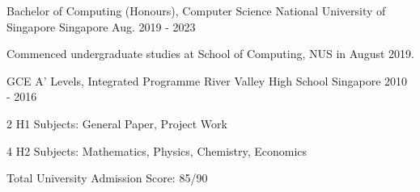 

\begin{cventries}

  \cventry
    {Bachelor of Computing (Honours), Computer Science} %
    {National University of Singapore} %
    {Singapore} %
    {Aug. 2019 - 2023} %
    {
      \begin{cvitems} %
        \item {Commenced undergraduate studies at School of Computing, NUS in August 2019.}
      \end{cvitems}
    }
    
  \cventry
    {GCE A' Levels, Integrated Programme} %
    {River Valley High School} %
    {Singapore} %
    {2010 - 2016} %
    {
      \begin{cvitems} %
        \item {2 H1 Subjects: General Paper, Project Work}
        \item {4 H2 Subjects: Mathematics, Physics, Chemistry, Economics}
        \item {Total University Admission Score: 85/90}
      \end{cvitems}
    }

\end{cventries}

